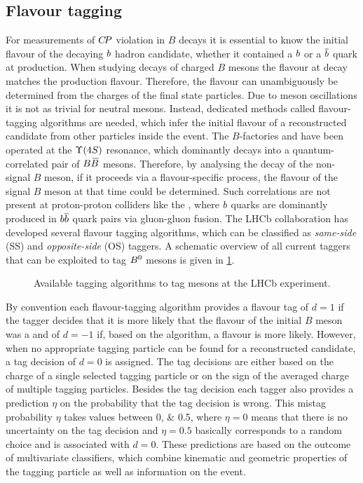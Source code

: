 
\subsection{Flavour tagging}
\label{sec:detector:software:tagging}

For measurements of ${C\!P}$ violation in $B$ decays it is essential to know the
initial flavour of the decaying ${b}$ hadron candidate, \ie whether it
contained a ${b}$ or a ${\overline {{b}}}$ quark at production. When studying
decays of charged $B$ mesons the flavour at decay matches the production
flavour. Therefore, the flavour can unambiguously be determined from the
charges of the final state particles. Due to meson oscillations it is not as
trivial for neutral mesons. Instead, dedicated methods called flavour-tagging
algorithms are needed, which infer the initial flavour of a reconstructed
candidate from other particles inside the event. The $B$-factories \babar and
\belle have been operated at the $\FourS$ resonance, which dominantly decays into a
quantum-correlated pair of $B{\kern 0.18em\overline{\kern -0.18em B}{}}$ mesons. Therefore, by analysing the decay
of the non-signal $B$ meson, \eg if it proceeds via a flavour-specific
process, the flavour of the signal $B$ meson at that time could be determined.
Such correlations are not present at proton-proton colliders like the \lhc,
where ${b}$ quarks are dominantly produced in ${{b}{\overline {{b}}}}$ quark pairs via
gluon-gluon fusion. The LHCb collaboration has developed several flavour
tagging algorithms, which can be classified as \emph{same-side} (SS) and
\emph{opposite-side} (OS) taggers. A schematic overview of all current taggers
that can be exploited to tag ${{B}^0}$ mesons is given in
\cref{fig:detector:tagging:schematics}.
\begin{figure}[htb]
\centering

\caption{Available tagging algorithms to tag \Bz mesons at the LHCb experiment.}
\label{fig:detector:tagging:schematics}
\end{figure}
By convention each flavour-tagging algorithm provides a flavour tag of $d =
\num{+1}$ if the tagger decides that it is more likely that the flavour of the
initial $B$ meson was a \Bz and of $d = \num{-1}$ if, based on the algorithm,
a \Bzb flavour is more likely. However, when no appropriate tagging particle
can be found for a reconstructed candidate, a tag decision of $d = 0$ is
assigned. The tag decisions are either based on the charge of a single
selected tagging particle or on the sign of the averaged charge of multiple
tagging particles. Besides the tag decision each tagger also provides a
prediction $\eta$ on the probability that the tag decision is wrong. This
mistag probability $\eta$ takes values between \numlist{0;0.5}, where $\eta =
0$ means that there is no uncertainty on the tag decision and $\eta = 0.5$
basically corresponds to a random choice and is associated with $d = 0$. These
predictions are based on the outcome of multivariate classifiers, which
combine kinematic and geometric properties of the tagging particle as well as
information on the event.

